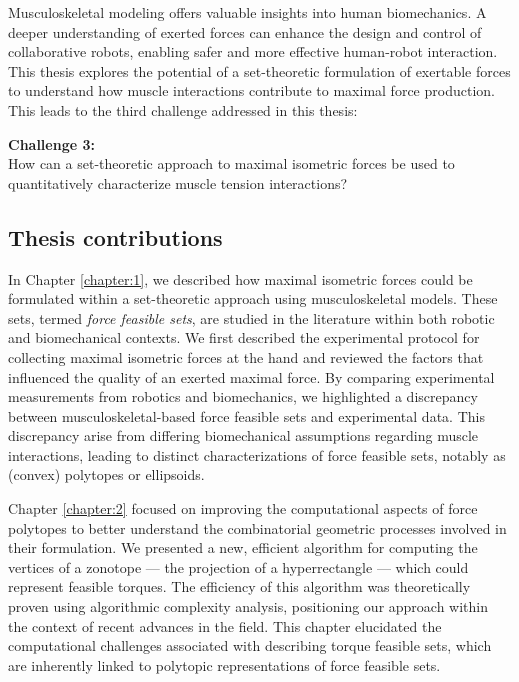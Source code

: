 Musculoskeletal modeling offers valuable insights into human biomechanics. A deeper understanding of exerted forces can enhance the design and control of collaborative robots, enabling safer and more effective human-robot interaction. This thesis explores the potential of a set-theoretic formulation of exertable forces to understand how muscle interactions contribute to maximal force production. This leads to the third challenge addressed in this thesis:
\begin{mdframed}
    \begin{center}
        \textbf{Challenge 3:} \\
        How can a set-theoretic approach to maximal isometric forces be used to quantitatively characterize muscle tension interactions?
    \end{center}
\end{mdframed}


\subsection*{Thesis contributions}
In Chapter \ref{chapter:1}, we described how maximal isometric forces could be formulated within a set-theoretic approach using musculoskeletal models. These sets, termed \emph{force feasible sets}, are studied in the literature within both robotic and biomechanical contexts. We first described the experimental protocol for collecting maximal isometric forces at the hand and reviewed the factors that influenced the quality of an exerted maximal force. By comparing experimental measurements from robotics and biomechanics, we highlighted a discrepancy between musculoskeletal-based force feasible sets and experimental data. This discrepancy arise from differing biomechanical assumptions regarding muscle interactions, leading to distinct characterizations of force feasible sets, notably as (convex) polytopes or ellipsoids.

Chapter \ref{chapter:2} focused on improving the computational aspects of force polytopes to better understand the combinatorial geometric processes involved in their formulation. We presented a new, efficient algorithm for computing the vertices of a zonotope — the projection of a hyperrectangle — which could represent feasible torques. The efficiency of this algorithm was theoretically proven using algorithmic complexity analysis, positioning our approach within the context of recent advances in the field. This chapter elucidated the computational challenges associated with describing torque feasible sets, which are inherently linked to polytopic representations of force feasible sets.

